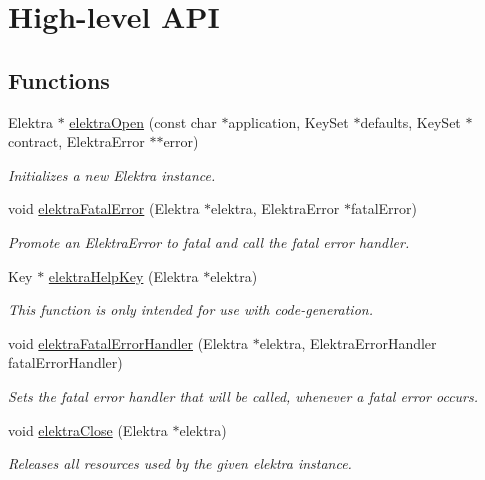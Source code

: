 \hypertarget{group__highlevel}{}\section{High-\/level A\+PI}
\label{group__highlevel}
\subsection*{Functions}
\begin{DoxyCompactItemize}
\item 
Elektra $\ast$ \mbox{\hyperlink{group__highlevel_ga45de58b05c7a8ab02f6c54ddd31a56e1}{elektra\+Open}} (const char $\ast$application, Key\+Set $\ast$defaults, Key\+Set $\ast$contract, Elektra\+Error $\ast$$\ast$error)
\begin{DoxyCompactList}\small\item\em Initializes a new Elektra instance. \end{DoxyCompactList}\item 
void \mbox{\hyperlink{group__highlevel_ga57d87ff6defe4db402b772ab2a0025f9}{elektra\+Fatal\+Error}} (Elektra $\ast$elektra, Elektra\+Error $\ast$fatal\+Error)
\begin{DoxyCompactList}\small\item\em Promote an Elektra\+Error to fatal and call the fatal error handler. \end{DoxyCompactList}\item 
Key $\ast$ \mbox{\hyperlink{group__highlevel_ga5d1462351e703f59b8faf57955219eb8}{elektra\+Help\+Key}} (Elektra $\ast$elektra)
\begin{DoxyCompactList}\small\item\em This function is only intended for use with code-\/generation. \end{DoxyCompactList}\item 
void \mbox{\hyperlink{group__highlevel_ga496441e9e1dd80ed14a239dfc4c08c40}{elektra\+Fatal\+Error\+Handler}} (Elektra $\ast$elektra, Elektra\+Error\+Handler fatal\+Error\+Handler)
\begin{DoxyCompactList}\small\item\em Sets the fatal error handler that will be called, whenever a fatal error occurs. \end{DoxyCompactList}\item 
void \mbox{\hyperlink{group__highlevel_ga9b688b7250e5f9d8ea6701cc2cc269af}{elektra\+Close}} (Elektra $\ast$elektra)
\begin{DoxyCompactList}\small\item\em Releases all resources used by the given elektra instance. \end{DoxyCompactList}\item 
$$
\end{DoxyCompactItemize}
